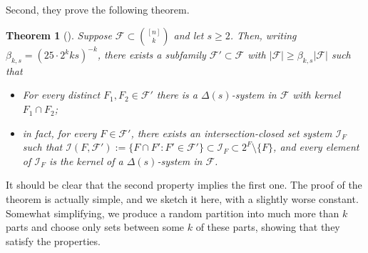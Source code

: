 \documentclass[graybox]{svmult}
\renewcommand{\ge}{\geqslant}
\newcommand{\ff}{\mathcal{F}}
\newcommand{\m}{\mathcal}
\newtheorem{thm}{Theorem}
\begin{document}
Second, they prove the following theorem.
\begin{thm}[\cite{JJSW}]\label{thmjjsw} Suppose $\ff\subset {[n]\choose k}$ and let $s\ge 2$. Then, writing $\beta_{k,s} = (25\cdot 2^k ks)^{-k}$, there exists a subfamily $\ff'\subset \ff$ with $|\ff|\ge \beta_{k,s}|\ff|$ such that
\begin{itemize}
  \item For every distinct $F_1,F_2\in \ff'$ there is a $\Delta(s)$-system in $\ff$ with kernel $F_1\cap F_2$;
  \item in fact, for every $F\in \ff'$, there exists an intersection-closed set system $\m I_F$ such that $\m I(F,\m F'):=\{F\cap F': F'\in \ff'\}\subset \m I_F\subset 2^F\setminus \{F\}$, and every element of $\m I_F$ is the kernel of a $\Delta(s)$-system in $\ff$.
\end{itemize}
\end{thm}
It should be clear that the second property implies the first one. The proof of the theorem is actually simple, and we sketch it here, with a slightly worse constant. Somewhat simplifying, we produce a random partition into much more than $k$ parts and choose only sets between some $k$ of these parts, showing that they satisfy the properties.
\end{document}
